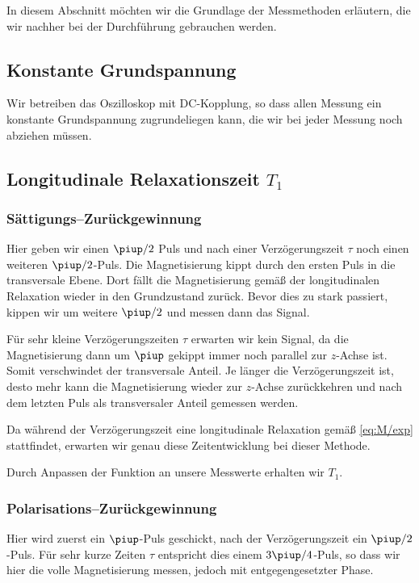 In diesem Abschnitt möchten wir die Grundlage der Messmethoden erläutern, die
wir nachher bei der Durchführung gebrauchen werden.

\subsection{Konstante Grundspannung}

Wir betreiben das Oszilloskop mit DC-Kopplung, so dass allen Messung ein
konstante Grundspannung zugrundeliegen kann, die wir bei jeder Messung noch
abziehen müssen.

\subsection{Longitudinale Relaxationszeit $T_1$}

\subsubsection{Sättigungs–Zurückgewinnung}

Hier geben wir einen $\piup/2$ Puls und nach einer Verzögerungszeit $\tau$ noch
einen weiteren $\piup/2$-Puls. Die Magnetisierung kippt durch den ersten Puls in
die transversale Ebene. Dort fällt die Magnetisierung gemäß der longitudinalen
Relaxation wieder in den Grundzustand zurück. Bevor dies zu stark passiert,
kippen wir um weitere $\piup/2$ und messen dann das Signal.

Für sehr kleine Verzögerungszeiten $\tau$ erwarten wir kein Signal, da die
Magnetisierung dann um $\piup$ gekippt immer noch parallel zur $z$-Achse ist.
Somit verschwindet der transversale Anteil. Je länger die Verzögerungszeit ist,
desto mehr kann die Magnetisierung wieder zur $z$-Achse zurückkehren und nach
dem letzten Puls als transversaler Anteil gemessen werden.

Da während der Verzögerungszeit eine longitudinale Relaxation gemäß
\eqref{eq:M/exp} stattfindet, erwarten wir genau diese Zeitentwicklung bei
dieser Methode.

Durch Anpassen der Funktion an unsere Messwerte erhalten wir $T_1$.

\subsubsection{Polarisations–Zurückgewinnung}

Hier wird zuerst ein $\piup$-Puls geschickt, nach der Verzögerungszeit ein
$\piup/2$-Puls. Für sehr kurze Zeiten $\tau$ entspricht dies einem
$3\piup/4$-Puls, so dass wir hier die volle Magnetisierung messen, jedoch mit
entgegengesetzter Phase.

